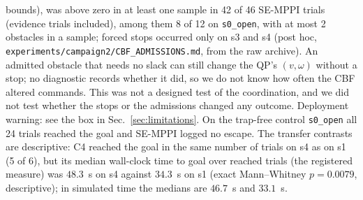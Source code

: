 \documentclass[journal]{IEEEtran}
\begin{document}
bounds), was above zero in at least one sample in 42 of 46 SE-MPPI trials (evidence trials included),
among them 8 of 12 on \texttt{s0\_open}, with at most 2 obstacles in a sample; forced stops occurred
only on s3 and s4 (post hoc, \texttt{experiments/campaign2/}\allowbreak\texttt{CBF\_ADMISSIONS.md},
from the raw archive). An admitted obstacle that needs no slack can still change the QP's
$(v,\omega)$ without a stop; no diagnostic records whether it did, so we do not know how often the
CBF altered commands. This was
not a designed test of the coordination, and we did not test whether the stops or the admissions
changed any outcome. Deployment warning: see the box in Sec.~\ref{sec:limitations}.
On the trap-free control \texttt{s0\_open} all 24 trials reached the goal and SE-MPPI logged no
escape. The transfer contrasts are descriptive: C4 reached the goal in the same number of trials on s4 as on s1
(5 of 6), but its median wall-clock time to goal over reached trials (the registered measure)
was $48.3$~s on s4 against $34.3$~s on s1 (exact Mann--Whitney $p=0.0079$, descriptive); in
simulated time the medians are $46.7$~s and $33.1$~s.
\end{document}
